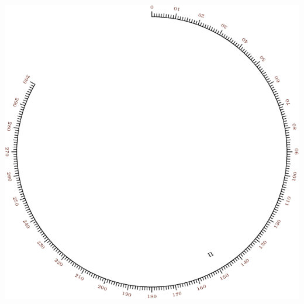 \documentclass[a4paper,11pt,english]{sphinxmanual}
\begin{document}
\includegraphics{ex_axes_8_1.pdf}
\end{document}
